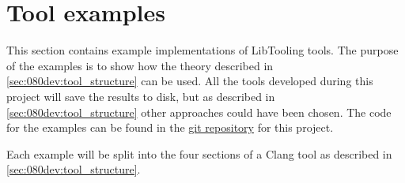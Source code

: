 \chapter{Tool examples}
This section contains example implementations of LibTooling tools. The purpose of the examples is to show how the theory described in \cref{sec:080dev:tool_structure} can be used. All the tools developed during this project will save the results to disk, but as described in \cref{sec:080dev:tool_structure} other approaches could have been chosen. The code for the examples can be found in the \href{https://github.com/mortenhaahr/RD/tree/main/examples}{git repository} for this project. 

Each example will be split into the four sections of a Clang tool as described in \cref{sec:080dev:tool_structure}. 

